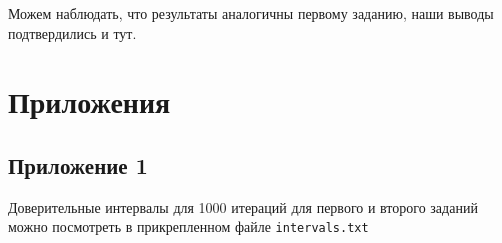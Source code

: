 \documentclass[a4paper, 12pt]{article}
\begin{document}
    Можем наблюдать, что результаты аналогичны первому заданию, наши выводы подтвердились и тут.


    \section{Приложения}
    \subsection{Приложение 1}
    Доверительные интервалы для 1000 итераций для первого и второго заданий можно посмотреть в прикрепленном файле \texttt{intervals.txt}
\end{document}
